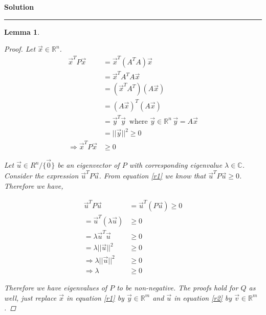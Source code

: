 \documentclass[a4paper,12pt]{article}
\newenvironment{solution}[2][]{%
    \begin{mdframed}[linecolor=blue!70!black, linewidth=2pt, roundcorner=10pt, backgroundcolor=yellow!10!white, skipabove=12pt, skipbelow=12pt]%
        \textbf{\large #2}
        \par\noindent\rule{\textwidth}{0.4pt}
}{
    \end{mdframed}
}
\newtheorem{lemma}{Lemma}
\begin{document}
\begin{solution}{Solution}
\begin{lemma}
\begin{proof}
            Let $\vec{x} \in \mathbb{R}^{n}$. 
            \begin{align}
            \vec{x}^{T} P \vec{x} &= \vec{x}^{T}(A^{T}A) \vec{x} \nonumber \\ 
                                  &= \vec{x}^{T} A^{T} A \vec{x} \nonumber \\
                                  &= (\vec{x}^{T} A^{T}) (A \vec{x}) \nonumber \\
                                  &= {(A \vec{x})}^{T} (A\vec{x}) \nonumber \\
                                  &= \vec{y}^{T} \vec{y} \, \text{ where $\vec{y} \in \mathbb{R}^{n} \, \vec{y} = A \vec{x}$} \nonumber \\
                                  &= \lvert \lvert \vec{y} \rvert \rvert^{2} \geqslant 0 \nonumber \\
            \Rightarrow \label{r1}\vec{x}^{T} P \vec{x} &\geqslant 0
            \end{align}
            
            Let $\vec{u} \in R^{n}/\{\vec{0}\} $ be an eigenvector of $P$ with corresponding eigenvalue $\lambda \in \mathbb{C}$.
            Consider the expression $\vec{u}^{T} P \vec{u}$. From equation \@\ref{r1} we know that $\vec{u}^{T} P \vec{u} \geqslant 0$.
            Therefore we have,

            \begin{align}
               \vec{u}^{T} P \vec{u} &= \vec{u}^{T}(P \vec{u}) \geqslant 0 \nonumber  \\
                                     = \vec{u}^{T}(\lambda \vec{u}) &\geqslant 0 \nonumber \\
                                     = \lambda \vec{u}^{T} \vec{u} &\geqslant 0\nonumber \\
                                     = \lambda \lvert\lvert \vec{u} \rvert\rvert^{2} &\geqslant 0 \nonumber \\
                \Rightarrow \lambda \lvert\lvert \vec{u} \rvert\rvert^{2} &\geqslant 0 \nonumber \\
                \Rightarrow \label{r2}\lambda &\geqslant 0
            \end{align}

            Therefore we have eigenvalues of $P$ to be non-negative. The proofs hold for $Q$ as well, just replace $\vec{x}$ in
            equation \@\ref{r1} by $\vec{y} \in \mathbb{R}^{m}$ and $\vec{u}$ in equation \@\ref{r2} by
            $\vec{v} \in \mathbb{R}^{m}$.
          \end{proof}
        \end{lemma}


\end{solution}
\end{document}
